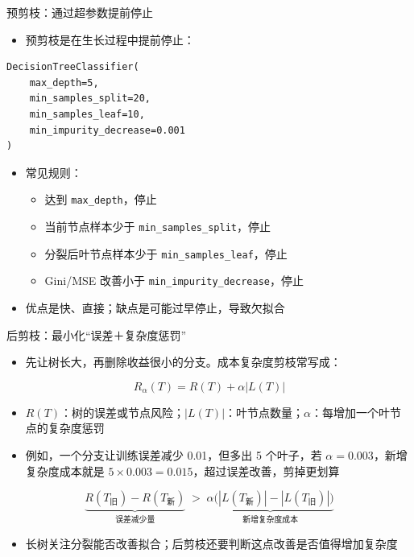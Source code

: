 \documentclass[10pt,aspectratio=43]{beamer}
\begin{document}
\begin{frame}[fragile]{预剪枝：通过超参数提前停止}
  \begin{itemize}
    \item 预剪枝是在生长过程中提前停止：
  \end{itemize}
  {\scriptsize
  \begin{verbatim}
DecisionTreeClassifier(
    max_depth=5,
    min_samples_split=20,
    min_samples_leaf=10,
    min_impurity_decrease=0.001
)
  \end{verbatim}}
  \begin{itemize}
    \item 常见规则：
      \begin{itemize}
        \item 达到 \texttt{max\_depth}，停止
        \item 当前节点样本少于 \texttt{min\_samples\_split}，停止
        \item 分裂后叶节点样本少于 \texttt{min\_samples\_leaf}，停止
        \item Gini/MSE 改善小于 \texttt{min\_impurity\_decrease}，停止
      \end{itemize}
    \item 优点是快、直接；缺点是可能过早停止，导致欠拟合
  \end{itemize}
\end{frame}

\begin{frame}{后剪枝：最小化“误差＋复杂度惩罚”}
  \begin{itemize}
    \item 先让树长大，再删除收益很小的分支。成本复杂度剪枝常写成：
  \end{itemize}
  \[
    R_\alpha(T)=R(T)+\alpha|L(T)|
  \]
  \begin{itemize}
    \item $R(T)$：树的误差或节点风险；$|L(T)|$：叶节点数量；$\alpha$：每增加一个叶节点的复杂度惩罚
    \item 例如，一个分支让训练误差减少 0.01，但多出 5 个叶子，若 $\alpha=0.003$，新增复杂度成本就是 $5\times0.003=0.015$，超过误差改善，剪掉更划算
  \end{itemize}
  \[
    \underbrace{R(T_{\text{旧}})-R(T_{\text{新}})}_{\text{误差减少量}}
    \;>\;
    \underbrace{\alpha\bigl(|L(T_{\text{新}})|-|L(T_{\text{旧}})|\bigr)}_{\text{新增复杂度成本}}
  \]
  \begin{itemize}
    \item 长树关注分裂能否改善拟合；后剪枝还要判断这点改善是否值得增加复杂度
  \end{itemize}
\end{frame}
\end{document}
